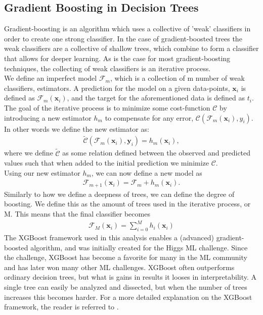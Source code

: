 \subsection{Gradient Boosting in Decision Trees}
Gradient-boosting is an algorithm which uses a collective of 'weak' 
classifiers in order to create one strong classifier. In the case of gradient-boosted 
trees the weak classifiers are a collective of shallow trees, which combine to form a classifier 
that allows for deeper learning. As is the case for most gradient-boosting 
techniques, the collecting of weak classifiers is an iterative process.
\\
We define an imperfect model $\mathcal{F}_m$, which is a collection of m number of weak 
classifiers, estimators. A prediction for the model on a given data-points, $\textbf{x}_i$ is 
defined as $\mathcal{F}_m(\textbf{x}_i)$, and the target for the aforementioned data is 
defined as $t_i$. The goal of the iterative process is to minimize some cost-function 
$\mathcal{C}$ by introducing a new estimator $h_m$ to compensate for any error, 
$\mathcal{C}(\mathcal{F}_m(\textbf{x}_i), y_i)$. In other words we define the new estimator as:
\begin{align}
    \tilde{\mathcal{C}}(\mathcal{F}_m(\textbf{x}_i), \textbf{y}_i) = h_m(\textbf{x}_i),
\end{align}
where we define $\tilde{\mathcal{C}}$ as some relation defined between the observed and 
predicted values such that when added to the initial prediction we minimize $\mathcal{C}$.
\\
Using our new estimator $h_m$, we can now define a new model as
\begin{align}
    \mathcal{F}_{m+1}(\textbf{x}_i) = \mathcal{F}_m + h_m (\textbf{x}_i).
\end{align}
Similarly to how we define a deepness of trees, we can define the degree of boosting. We define 
this as the amount of trees used in the iterative process, or M. This means that the final classifier 
becomes
\begin{align}
    \mathcal{F}_M (\textbf{x}_i) = \sum_{i=0}^M h_i(\textbf{x}_i)
\end{align} 
The XGBoost \cite{XGB} framework used in this analysis enables a (advanced) gradient-boosted algorithm, 
and was initially created for the Higgs ML challenge. Since the challenge, XGBoost has become 
a favorite for many in the ML community and has later won many other ML challenges. XGBoost 
often outperforms ordinary decision trees, but what is gains in results it looses in 
interpretability. A single tree can easily be analyzed and dissected, but when the number 
of trees increases this becomes harder. For a more detailed explanation on the XGBoost framework,
the reader is referred to \cite{XGB}.